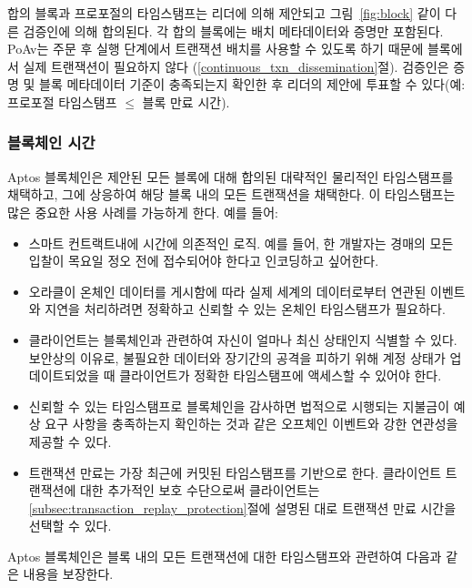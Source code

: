 \documentclass{article}
\begin{document}
합의 블록과 프로포절의 타임스탬프는 리더에 의해 제안되고 그림~\ref{fig:block} 같이 다른 검증인에 의해 합의된다. 각 합의 블록에는 배치 메타데이터와 증명만 포함된다. PoAv는 주문 후 실행 단계에서 트랜잭션 배치를 사용할 수 있도록 하기 때문에 블록에서 실제 트랜잭션이 필요하지 않다 (\ref{continuous_txn_dissemination}절). 검증인은 증명 및 블록 메타데이터 기준이 충족되는지 확인한 후 리더의 제안에 투표할 수 있다(예: 프로포절 타임스탬프 $\leq$ 블록 만료 시간).

\subsubsection{블록체인 시간}
\label{subsubsec:blockchain_time}

Aptos 블록체인은 제안된 모든 블록에 대해 합의된 대략적인 물리적인 타임스탬프를 채택하고, 그에 상응하여 해당 블록 내의 모든 트랜잭션을 채택한다. 이 타임스탬프는 많은 중요한 사용 사례를 가능하게 한다. 예를 들어:

\begin{itemize}
\item 스마트 컨트랙트내에 시간에 의존적인 로직. 예를 들어, 한 개발자는 경매의 모든 입찰이 목요일 정오 전에 접수되어야 한다고 인코딩하고 싶어한다.

\item 오라클이 온체인 데이터를 게시함에 따라 실제 세계의 데이터로부터 연관된 이벤트와 지연을 처리하려면 정확하고 신뢰할 수 있는 온체인 타임스탬프가 필요하다.

\item 클라이언트는 블록체인과 관련하여 자신이 얼마나 최신 상태인지 식별할 수 있다. 보안상의 이유로, 불필요한 데이터와 장기간의 공격을 피하기 위해 계정 상태가 업데이트되었을 때 클라이언트가 정확한 타임스탬프에 액세스할 수 있어야 한다.

\item 신뢰할 수 있는 타임스탬프로 블록체인을 감사하면 법적으로 시행되는 지불금이 예상 요구 사항을 충족하는지 확인하는 것과 같은 오프체인 이벤트와 강한 연관성을 제공할 수 있다.

\item 트랜잭션 만료는 가장 최근에 커밋된 타임스탬프를 기반으로 한다. 클라이언트 트랜잭션에 대한 추가적인 보호 수단으로써 클라이언트는 \ref{subsec:transaction_replay_protection}절에 설명된 대로 트랜잭션 만료 시간을 선택할 수 있다.
\end{itemize}

Aptos 블록체인은 블록 내의 모든 트랜잭션에 대한 타임스탬프와 관련하여 다음과 같은 내용을 보장한다.
\end{document}
